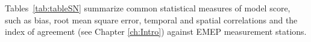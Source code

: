 \vspace{1cm}

Tables~\ref{tab:tableSN} summarize common statistical measures of model score, such as bias, root mean square error, temporal and spatial correlations and the index of agreement (see Chapter \ref{ch:Intro}) against EMEP measurement stations.

\begin{table}\small










\end{table}
